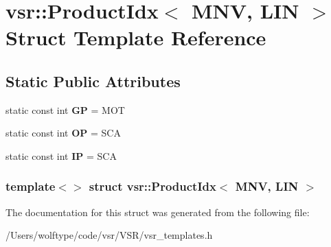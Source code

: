 \hypertarget{structvsr_1_1_product_idx_3_01_m_n_v_00_01_l_i_n_01_4}{\section{vsr\-:\-:Product\-Idx$<$ M\-N\-V, L\-I\-N $>$ Struct Template Reference}
\label{structvsr_1_1_product_idx_3_01_m_n_v_00_01_l_i_n_01_4}
}
\subsection*{Static Public Attributes}
\begin{DoxyCompactItemize}
\item 
\hypertarget{structvsr_1_1_product_idx_3_01_m_n_v_00_01_l_i_n_01_4_ac541f948b780e536c2cee8662666ede1}{static const int {\bfseries G\-P} = M\-O\-T}\label{structvsr_1_1_product_idx_3_01_m_n_v_00_01_l_i_n_01_4_ac541f948b780e536c2cee8662666ede1}

\item 
\hypertarget{structvsr_1_1_product_idx_3_01_m_n_v_00_01_l_i_n_01_4_adfe05867c0fff1603ea4d48aa0d1cdbc}{static const int {\bfseries O\-P} = S\-C\-A}\label{structvsr_1_1_product_idx_3_01_m_n_v_00_01_l_i_n_01_4_adfe05867c0fff1603ea4d48aa0d1cdbc}

\item 
\hypertarget{structvsr_1_1_product_idx_3_01_m_n_v_00_01_l_i_n_01_4_aac7bde3f1a8d1a02c650da62298ddbca}{static const int {\bfseries I\-P} = S\-C\-A}\label{structvsr_1_1_product_idx_3_01_m_n_v_00_01_l_i_n_01_4_aac7bde3f1a8d1a02c650da62298ddbca}

\end{DoxyCompactItemize}
\subsubsection*{template$<$$>$ struct vsr\-::\-Product\-Idx$<$ M\-N\-V, L\-I\-N $>$}



The documentation for this struct was generated from the following file\-:\begin{DoxyCompactItemize}
\item 
/\-Users/wolftype/code/vsr/\-V\-S\-R/vsr\-\_\-templates.\-h\end{DoxyCompactItemize}

